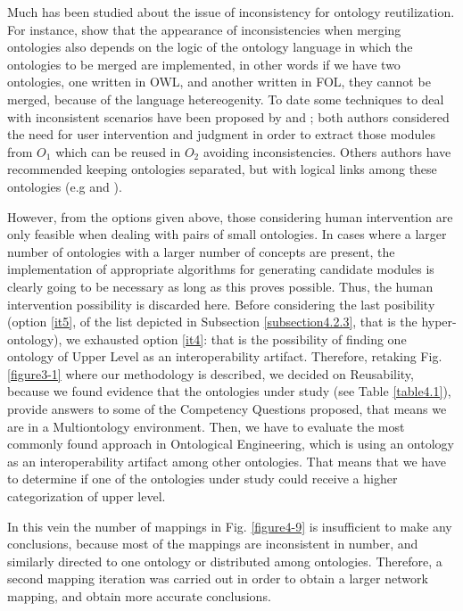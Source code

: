 Much has been studied about the issue   of inconsistency for ontology reutilization. For instance, \cite{ghilardi_did_2006} show that the appearance of inconsistencies when merging ontologies also depends on the logic of the ontology language in which the ontologies to be merged are implemented, in other words if we have two ontologies, one written in OWL, and another written in FOL, they cannot be merged, because of the language hetereogenity. To date some techniques to deal with inconsistent scenarios have been proposed by \citet{grau_owl_2008}  and \citet{xiang_ontofox:_2010}; both authors considered the need for user intervention and judgment in order to extract those modules from  $O_{1}$ which can be reused in $O_{2}$ avoiding inconsistencies. Others  authors have recommended keeping ontologies separated, but with logical links among these ontologies (e.g \citet{bateman_oasis_2009} and \citet{kutz_carnap_2010}). 

However, from the options given above, those considering human intervention are only feasible when dealing with pairs of small ontologies. In cases where a larger number of ontologies with a larger number of concepts are present, the implementation of appropriate algorithms for generating candidate modules is clearly going to be necessary as long as this proves possible.  Thus, the human intervention possibility is discarded here. Before considering the last posibility  (option \ref{it5}, of the list depicted in Subsection \ref{subsection4.2.3}, that is the  hyper-ontology), we exhausted option \ref{it4}: that is the possibility of finding one ontology of Upper Level as an interoperability artifact. Therefore, retaking Fig. \ref{figure3-1} where our methodology is described, we  decided on Reusability, because we found evidence that the ontologies under study (see Table \ref{table4.1}), provide answers to some of the Competency Questions proposed, that means we are in a Multiontology environment. Then, we have to evaluate the most commonly found approach in Ontological Engineering, which is using an ontology as an interoperability artifact among other ontologies. That means that  we have to determine if one of the ontologies under study could receive  a higher categorization of upper level.   

In this vein the number of mappings in Fig. \ref{figure4-9} is insufficient to make any conclusions, because most of the mappings are inconsistent in number, and similarly directed to one ontology or distributed among ontologies. Therefore, a second mapping iteration   was carried out in order to obtain a larger network mapping, and obtain more accurate conclusions. 

